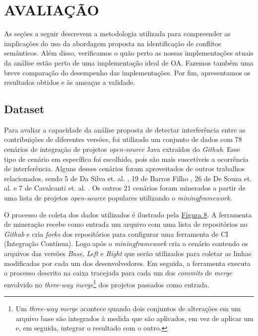 \section{AVALIAÇÃO}

As seções a seguir descrevem a metodologia utilizada para compreender as implicações do uso da abordagem proposta na identificação de conflitos semânticos. Além disso, verificamos o quão perto as nossas implementações atuais da análise estão perto de uma implementação ideal de OA. Fazemos também uma breve comparação do desempenho das implementações. Por fim, apresentamos os resultados obtidos e às ameaças a validade.

\subsection{Dataset}
Para avaliar a capacidade da análise proposta de detectar interferência entre as contribuições de diferentes versões, foi utilizado um conjunto de dados com 78 cenários de integração de projetos \emph{open-source} Java extraídos do \emph{Github}.  Esse tipo de cenário em específico foi escolhido, pois são mais suscetíveis a ocorrência de interferência. Alguns desses cenários foram aproveitados de outros trabalhos relacionados, sendo 5 de Da Silva et. al. \cite{LeusonSilva2020}, 19 de Barros Filho  \cite{InformationFlowRoberto}, 26 de De Souza et. al. \cite{10.1145/958160.958177} e 7 de Cavalcanti et. al. \cite{10.1109/ASE.2019.00097}. Os outros 21 cenários foram minerados a partir de uma lista de projetos \emph{open-source} populares utilizando o \emph{miningframework}. 

O processo de coleta dos dados utilizados é ilustrado pela \hyperref[fig:mineracao]{Figura 8}. A ferramenta de mineração recebe como entrada um arquivo com uma lista de repositórios no \emph{Github} e cria \emph{forks} dos repositórios para configurar uma ferramenta de CI (Integração Contínua). Logo após o \emph{miningframework} cria o cenário contendo os arquivos das versões \emph{Base}, \emph{Left} e \emph{Right} que serão utilizados para coletar as linhas modificadas por cada um dos desenvolvedores. Em seguida, a ferramenta executa o processo descrito na caixa tracejada para cada um dos \emph{commits} de \emph{merge} envolvido no \emph{three-way merge}\footnote{Um  \emph{three-way merge} acontece quando dois conjuntos de alterações em um arquivo base são integrados à medida que são aplicados, em vez de aplicar um e, em seguida, integrar o resultado com o outro.} dos projetos passados como entrada. 

